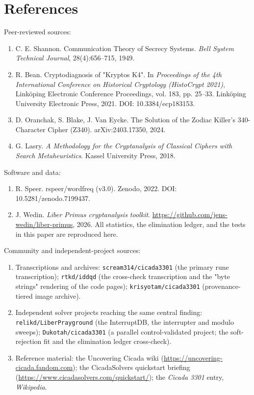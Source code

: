 \documentclass[11pt]{article}
\begin{document}
\section{References}

Peer-reviewed sources:


\begin{enumerate}
\item C. E. Shannon. Communication Theory of Secrecy Systems. \emph{Bell System Technical Journal}, 28(4):656–715, 1949.
\item R. Bean. Cryptodiagnosis of "Kryptos K4". In \emph{Proceedings of the 4th International Conference on Historical Cryptology (HistoCrypt 2021)}, Linköping Electronic Conference Proceedings, vol. 183, pp. 25–33. Linköping University Electronic Press, 2021. DOI: 10.3384/ecp183153.
\item D. Oranchak, S. Blake, J. Van Eycke. The Solution of the Zodiac Killer's 340-Character Cipher (Z340). arXiv:2403.17350, 2024.
\item G. Lasry. \emph{A Methodology for the Cryptanalysis of Classical Ciphers with Search Metaheuristics}. Kassel University Press, 2018.
\end{enumerate}

Software and data:


\begin{enumerate}
\item R. Speer. rspeer/wordfreq (v3.0). Zenodo, 2022. DOI: 10.5281/zenodo.7199437.
\item J. Wedin. \emph{Liber Primus cryptanalysis toolkit}. \url{https://github.com/jens-wedin/liber-primus}, 2026. All statistics, the elimination ledger, and the tests in this paper are reproduced here.
\end{enumerate}

Community and independent-project sources:


\begin{enumerate}
\item Transcriptions and archives: \texttt{scream314/cicada3301} (the primary rune transcription); \texttt{rtkd/iddqd} (the cross-check transcription and the "byte strings" rendering of the code pages); \texttt{krisyotam/cicada3301} (provenance-tiered image archive).
\item Independent solver projects reaching the same central finding: \texttt{relikd/LiberPrayground} (the InterruptDB, the interrupter and modulo sweeps); \texttt{Dukotah/cicada3301} (a parallel control-validated project; the soft-rejection fit and the elimination ledger cross-check).
\item Reference material: the Uncovering Cicada wiki (\url{https://uncovering-cicada.fandom.com}); the CicadaSolvers quickstart briefing (\url{https://www.cicadasolvers.com/quickstart/}); the \emph{Cicada 3301} entry, \emph{Wikipedia}.
\end{enumerate}
\end{document}
